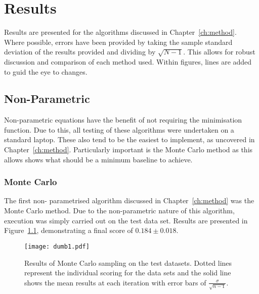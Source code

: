 \chapter{Results}










\graphicspath{{Chapter4/Figs/Vector/}{Chapter4/Figs/}}
Results are presented for the algorithms discussed in Chapter~\ref{ch:method}. Where possible, errors have been provided by taking the sample standard deviation of the results provided and dividing by $\sqrt{N-1}$. This allows for robust discussion and comparison of each method used. Within figures, lines are added to guid the eye to changes.

\section{Non-Parametric}
Non-parametric equations have the benefit of not requiring the minimisation function. Due to this, all testing of these algorithms were undertaken on a standard laptop. These also tend to be the easiest to implement, as uncovered in Chapter~\ref{ch:method}. Particularly important is the Monte Carlo method as this allows shows what should be a minimum baseline to achieve.

\subsection{Monte Carlo}
The first non- parametrised algorithm discussed in Chapter~\ref{ch:method} was the Monte Carlo method. Due to the non-parametric nature of this algorithm, execution was simply carried out on the test data set. Results are presented in Figure~\ref{fig:MCTestSet}, demonstrating a final score of ${0.184\pm{}0.018}$.

\begin{figure}[H]
  \begin{center}
    \texttt{[image: dumb1.pdf]}
    \caption[Monte Carlo]{Results of Monte Carlo sampling on the test datasets. Dotted lines represent the individual scoring for the data sets and the solid line shows the mean results at each iteration with error bars of $\frac{\sigma{}}{\sqrt{n-1}}$.}
    \label{fig:MCTestSet}
  \end{center}
\end{figure}

